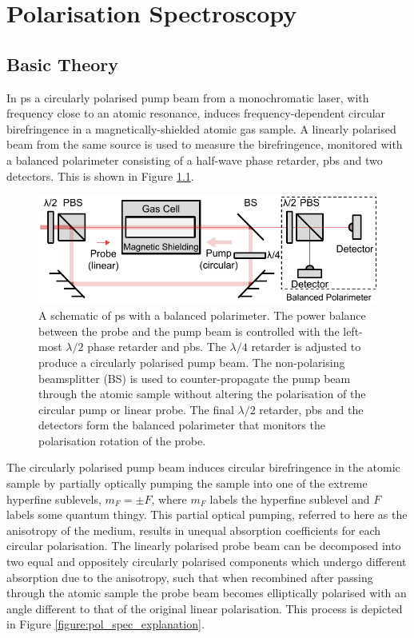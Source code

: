 \chapter{Polarisation Spectroscopy}\label{section:pol_spec_theory}
\section{Basic Theory}

In \gls{ps} a circularly polarised pump beam from a monochromatic laser, with frequency close to an atomic resonance, induces frequency-dependent circular birefringence in a magnetically-shielded atomic gas sample.
A linearly polarised beam from the same source is used to measure the birefringence, monitored with a balanced polarimeter consisting of a half-wave phase retarder, \gls{pbs} and two detectors.
This is shown in Figure \ref{figure:pol_spec_schematic}.

\begin{figure}
\centering
\includegraphics[width=\linewidth]{part1/Figs/PolSpecSchematic.pdf}
\caption{A schematic of \gls{ps} with a balanced polarimeter.
The power balance between the probe and the pump beam is controlled with the left-most $\lambda/2$ phase retarder and \gls{pbs}.
The $\lambda/4$ retarder is adjusted to produce a circularly polarised pump beam.
The non-polarising beamsplitter (BS) is used to counter-propagate the pump beam through the atomic sample without altering the polarisation of the circular pump or linear probe.
The final $\lambda/2$ retarder, \gls{pbs} and the detectors form the balanced polarimeter that monitors the polarisation rotation of the probe.}
\label{figure:pol_spec_schematic}
\end{figure}

The circularly polarised pump beam induces circular birefringence in the atomic sample by partially optically pumping the sample into one of the extreme hyperfine sublevels, $m_F=\pm F$, where $m_F$ labels the hyperfine sublevel and $F$ labels {\color{red}some quantum thingy.}
This partial optical pumping, referred to here as the anisotropy of the medium, results in unequal absorption coefficients for each circular polarisation.
The linearly polarised probe beam can be decomposed into two equal and oppositely circularly polarised components which undergo different absorption due to the anisotropy, such that when recombined after passing through the atomic sample the probe beam becomes elliptically polarised with an angle different to that of the original linear polarisation.
This process is depicted in Figure \ref{figure:pol_spec_explanation}.

